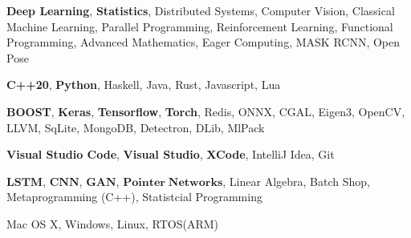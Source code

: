 %
%
%


	\begin{keywords}
		
			{
				\textbf{Deep Learning}, 
				\textbf{Statistics},
				Distributed Systems,
				Computer Vision,
				Classical Machine Learning,
				Parallel Programming,
				Reinforcement Learning,
				Functional Programming,
				Advanced Mathematics,
				Eager Computing,
				MASK RCNN,
				Open Pose
			}
				
			{
				\textbf{C++20}, 
				\textbf{Python},
				 Haskell, 
				 Java, 
				 Rust, 
				 Javascript,
				 Lua
			}
			
			{
				\textbf{BOOST},
				\textbf{Keras},
				\textbf{Tensorflow}, 
				\textbf{Torch},
				Redis,
				ONNX,
				CGAL, 
				Eigen3, 
				OpenCV,
				LLVM,
				SqLite,
				MongoDB,
				Detectron,
				DLib,
				MlPack
			}
		
			{
				\textbf{Visual Studio Code},
				\textbf{Visual Studio}, 
				\textbf{XCode},
				IntelliJ Idea, 
				Git
			}
		
		{
			$\mathbf{LSTM}$, $\mathbf{CNN}$, $\mathbf{GAN}$, 
			$\mathbf{Pointer \;Networks}$, Linear Algebra, Batch Shop, Metaprogramming (C++), Statistcial Programming
		}		
				
			{
				Mac OS X, 
				Windows, 
				Linux,
				RTOS(ARM)
			}
	\end{keywords}